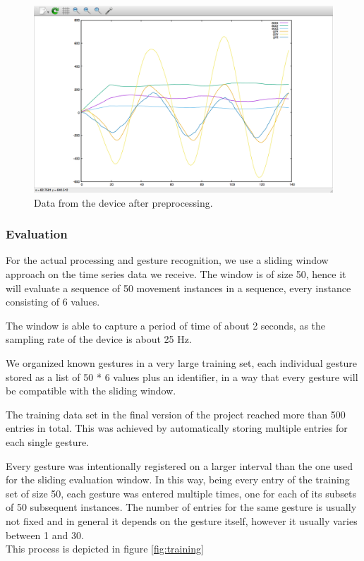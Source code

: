 \begin{figure}[h]
\centering
\includegraphics[width=1\columnwidth]{img/20}
\caption{Data from the device after preprocessing.}
\label{fig:figure3}
\end{figure}

\subsubsection{Evaluation}
For the actual processing and gesture recognition, we use a sliding window approach on the time series data we receive.
The window is of size 50, hence it will evaluate a sequence of 50 movement instances in a sequence,
every instance consisting of 6 values.

The window is able to capture a period of time of about 2 seconds, as the sampling rate of the device is about 25 Hz.

We organized known gestures in a very large training set, each individual gesture stored as a list of 50 * 6 values plus an identifier, in a way that every gesture will be compatible with the sliding window. 

The training data set in the final version of the project reached more than 500 entries in total.
This was achieved by automatically storing multiple entries for each single gesture.

Every gesture was intentionally registered on a larger interval than the one used for the sliding evaluation window.
In this way, being every entry of the training set of size 50,  each gesture was entered multiple times, one for each of its subsets of 50 subsequent instances.
The number of entries for the same gesture is usually not fixed and in general it depends on the gesture itself, however it usually varies between 1 and 30.\\
This process is depicted in figure \ref{fig:training}

